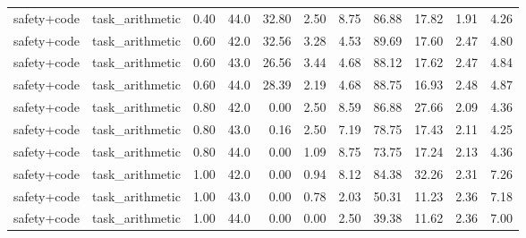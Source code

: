 \documentclass{article}
\begin{document}
\begin{table}[H]
{\begin{tabular}{llllrrrrrrr}
safety+code & task\_arithmetic & 0.40 & 44.0 & 32.80 & 2.50 & 8.75 & 86.88 & 17.82 & 1.91 & 4.26 \\
safety+code & task\_arithmetic & 0.60 & 42.0 & 32.56 & 3.28 & 4.53 & 89.69 & 17.60 & 2.47 & 4.80 \\
safety+code & task\_arithmetic & 0.60 & 43.0 & 26.56 & 3.44 & 4.68 & 88.12 & 17.62 & 2.47 & 4.84 \\
safety+code & task\_arithmetic & 0.60 & 44.0 & 28.39 & 2.19 & 4.68 & 88.75 & 16.93 & 2.48 & 4.87 \\
safety+code & task\_arithmetic & 0.80 & 42.0 & 0.00 & 2.50 & 8.59 & 86.88 & 27.66 & 2.09 & 4.36 \\
safety+code & task\_arithmetic & 0.80 & 43.0 & 0.16 & 2.50 & 7.19 & 78.75 & 17.43 & 2.11 & 4.25 \\
safety+code & task\_arithmetic & 0.80 & 44.0 & 0.00 & 1.09 & 8.75 & 73.75 & 17.24 & 2.13 & 4.36 \\
safety+code & task\_arithmetic & 1.00 & 42.0 & 0.00 & 0.94 & 8.12 & 84.38 & 32.26 & 2.31 & 7.26 \\
safety+code & task\_arithmetic & 1.00 & 43.0 & 0.00 & 0.78 & 2.03 & 50.31 & 11.23 & 2.36 & 7.18 \\
safety+code & task\_arithmetic & 1.00 & 44.0 & 0.00 & 0.00 & 2.50 & 39.38 & 11.62 & 2.36 & 7.00 \\
\bottomrule
\end{tabular}
}
\end{table}
\end{document}
